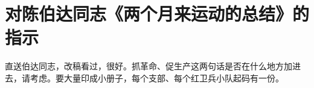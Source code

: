 \section[对陈伯达同志《两个月来运动的总结》的指示（一九六六年十月二十四日）]{对陈伯达同志《两个月来运动的总结》的指示}


直送伯达同志，改稿看过，很好。抓革命、促生产这两句话是否在什么地方加进去，请考虑。要大量印成小册子，每个支部、每个红卫兵小队起码有一份。

